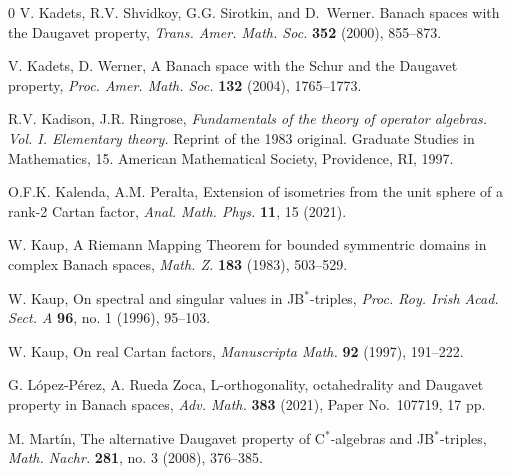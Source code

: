 \documentclass[10pt]{amsart}
\begin{document}
\begin{thebibliography}{0}
		 V. Kadets, R.V. Shvidkoy, G.G. Sirotkin, and D.\ Werner. Banach spaces with the Daugavet property, \emph{Trans. Amer. Math. Soc.} \textbf{352} (2000), 855--873.
		
		 V. Kadets, D. Werner, A Banach space with the Schur and the Daugavet property, \emph{Proc. Amer. Math. Soc.} \textbf{132} (2004), 1765--1773.
		
		 R.V. Kadison, J.R. Ringrose, \emph{Fundamentals of the theory of operator algebras. Vol. I. Elementary theory.} Reprint of the 1983 original. Graduate Studies in Mathematics, 15. American Mathematical Society, Providence, RI, 1997.
		
		 O.F.K. Kalenda, A.M. Peralta, Extension of isometries from the unit sphere of a rank-2 Cartan factor, \emph{Anal. Math. Phys.} \textbf{11}, 15 (2021). %
		
		
		 W. Kaup, A Riemann Mapping Theorem for bounded symmentric domains in complex Banach spaces, \emph{Math. Z.} \textbf{183} (1983), 503--529.
		
		 W. Kaup, On spectral and singular values in JB$^*$-triples, \emph{Proc. Roy. Irish Acad. Sect. A} \textbf{96}, no. 1 (1996), 95--103.
		
		 W. Kaup, On real Cartan factors, \emph{Manuscripta Math.} \textbf{92} (1997), 191--222.
		
		
		
		 G. L\'{o}pez-P\'{e}rez, A. Rueda Zoca, L-orthogonality, octahedrality and Daugavet property in Banach spaces, \emph{Adv. Math.} \textbf{383} (2021), Paper No.~107719, 17 pp.
		
		
		
		
		 M. Mart{\'i}n, The alternative Daugavet property of C$^*$-algebras and JB$^*$-triples, \emph{Math. Nachr.} \textbf{281}, no. 3 (2008), 376--385.
		

\end{thebibliography}
\end{document}

